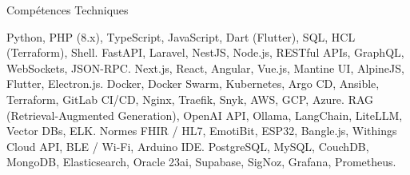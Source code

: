 \begin{rubric}{Compétences Techniques}

\entry*[Langages]
	Python, PHP (8.x), TypeScript, JavaScript, Dart (Flutter), SQL, HCL (Terraform), Shell.
	FastAPI, Laravel, NestJS, Node.js, RESTful APIs, GraphQL, WebSockets, JSON-RPC.
	Next.js, React, Angular, Vue.js, Mantine UI, AlpineJS, Flutter, Electron.js.
	Docker, Docker Swarm, Kubernetes, Argo CD, Ansible, Terraform, GitLab CI/CD, Nginx, Traefik, Snyk, AWS, GCP, Azure.
\entry*[IA \& Data]
	RAG (Retrieval-Augmented Generation), OpenAI API, Ollama, LangChain, LiteLLM, Vector DBs, ELK.
	Normes FHIR / HL7, EmotiBit, ESP32, Bangle.js, Withings Cloud API, BLE / Wi-Fi, Arduino IDE.
	PostgreSQL, MySQL, CouchDB, MongoDB, Elasticsearch, Oracle 23ai, Supabase, SigNoz, Grafana, Prometheus.

\end{rubric}
